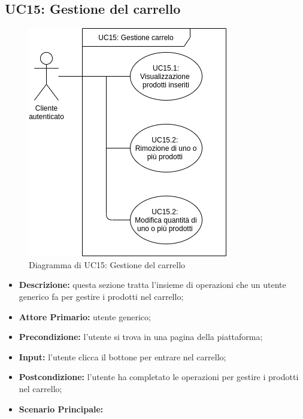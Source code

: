         \subsection{UC15: Gestione del carrello}
        \begin{figure}[!ht]
            \caption{Diagramma di UC15: Gestione del carrello}
            \vspace{10px}
            \includegraphics[scale=0.5]{../../../Images/AnalisiRequisiti/UC15}
            \centering
        \end{figure}
        \begin{itemize}
            \item \textbf{Descrizione:} questa sezione tratta l'insieme di operazioni che un utente generico fa per gestire i prodotti nel carrello;
            \item \textbf{Attore Primario:} utente generico;
            \item \textbf{Precondizione:} l'utente si trova in una pagina della piattaforma;
            \item \textbf{Input:} l'utente clicca il bottone per entrare nel carrello;
            \item \textbf{Postcondizione:} l'utente ha completato le operazioni per gestire i prodotti nel carrello;
            \item \textbf{Scenario Principale:}
        \end{itemize}
